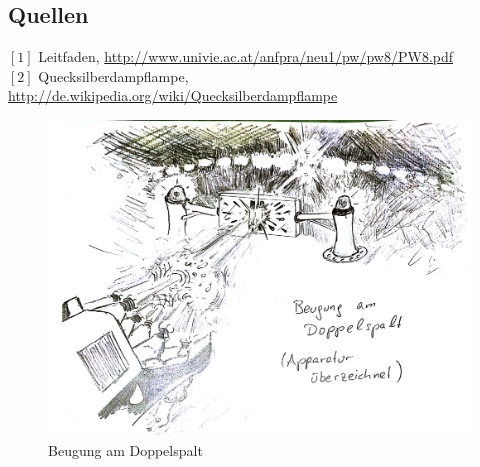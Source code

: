 \documentclass[12pt,a4paper]{article}
\begin{document}
\begin{multicols}{2}
\section{Quellen}
$[1]$ Leitfaden, \url{http://www.univie.ac.at/anfpra/neu1/pw/pw8/PW8.pdf}\\
$[2]$ Quecksilberdampflampe, \url{http://de.wikipedia.org/wiki/Quecksilberdampflampe}\\

\end{multicols}

\begin{figure}[H]
	\centering
	\includegraphics[scale=0.65]{./figure/laser_kanone.png}
	\caption{Beugung am Doppelspalt}
	\label{fig:laser_kanone}
\end{figure}
\end{document}
